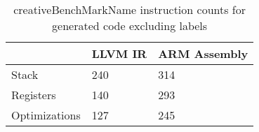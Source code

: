 \begin{table}[h!]
\centering
\begin{tabular}{p{}p{}p{}}
  \hline
 & LLVM IR & ARM Assembly \\ 
  \hline
Stack & 240 & 314 \\ 
  Registers & 140 & 293 \\ 
  Optimizations & 127 & 245 \\ 
   \hline
\end{tabular}
\caption{creativeBenchMarkName instruction counts for generated code excluding labels}
\end{table}
